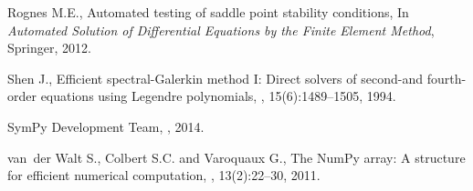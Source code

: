 \documentclass{marine_2015}
\begin{document}
\begin{thebibliography}{16}
Rognes M.E.,
\newblock Automated testing of saddle point stability conditions,
\newblock In {\em Automated Solution of Differential Equations by the Finite
  Element Method}, Springer, 2012.

Shen J.,
\newblock Efficient spectral-Galerkin method I: Direct solvers of second-and
  fourth-order equations using Legendre polynomials,
, 15(6):1489--1505, 1994.

{SymPy Development Team},
, 2014.

van~der Walt S., Colbert S.C. and Varoquaux G.,
\newblock The NumPy array: A structure for efficient numerical computation,
, 13(2):22--30, 2011.

\end{thebibliography}
\end{document}
